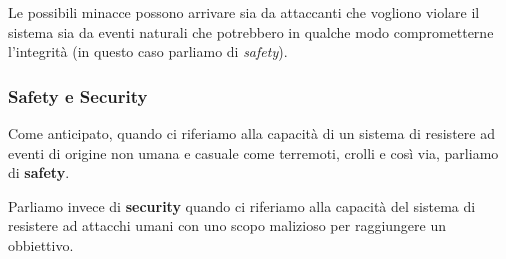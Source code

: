 Le possibili minacce possono arrivare sia da attaccanti che vogliono violare il sistema sia da eventi naturali che
potrebbero in qualche modo comprometterne l'integrità (in questo caso parliamo di \emph{safety}).

\subsubsection{Safety e Security}
Come anticipato, quando ci riferiamo alla capacità di un sistema di resistere ad eventi di origine non umana e casuale
come terremoti, crolli e così via, parliamo di \textbf{safety}.

Parliamo invece di \textbf{security} quando ci riferiamo alla capacità del sistema di resistere ad attacchi umani con
uno scopo malizioso per raggiungere un obbiettivo.
